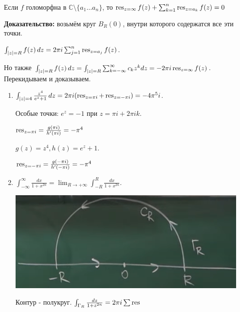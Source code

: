 \begin{consequence}
    Если $f$ голоморфна в $\mathbb{C} \setminus \{ a_1 \ldots a_n \} $, то
    $\operatorname{res}_{z = \infty} f(z) + \sum_{k = 1}^n \operatorname{res}_{z = a_k} f(z) = 0$

    \textbf{Доказательство:} возьмём круг $B_R (0)$, внутри которого содержатся все эти точки.

    $\int_{|z| = R} f(z) \, dz = 2 \pi i \sum_{j = 1}^n \operatorname{res}_{z = a_j} f(z)$.

    Но также $\int_{|z| = R} f(z) \, dz = \int_{|z| = R}{ \sum_{k = -\infty}^{\infty} c_k z^k dz } = -2 \pi i \operatorname{res}_{z = \infty} f(z)$. Перекидываем и доказываем.
\end{consequence}

\begin{example}
    \begin{enumerate}
        \item {
            $\int_{|z| = 4} \frac{z^4}{e^z + 1} \, dz = 2 \pi i (\operatorname{res}_{z = \pi i} + \operatorname{res}_{z = -\pi i}) = -4\pi^5 i$.

            Особые точки: $e^z = -1$ при $z = \pi i + 2 \pi i k$.

            $\operatorname{res}_{z = \pi i} = \frac{g(\pi i)}{h'(\pi i)} = -\pi^4$

            $g(z) = z^4, h(z) = e^z + 1$.

            $\operatorname{res}_{z = -\pi i} = \frac{g(-\pi i)}{h'(-\pi i)} = -\pi^4$
        }
        \item {
            $\int_{-\infty}^{\infty} \frac{dx}{1 + x^{2n}} = \lim_{R \to +\infty} \int_{-R}^{R} \frac{dx}{1 + x^{2n}}$.

            \begin{center}
                \includegraphics[width=12cm]{assets/04-functions-of-complex-variables/example-2-cauchy-about-deductions.png}
            \end{center}

            Контур - полукруг. $\int_{\Gamma_R} \frac{dz}{1 + z^{2n}} = 2 \pi i \sum \operatorname{res}$

}
\end{enumerate}
\end{example}
